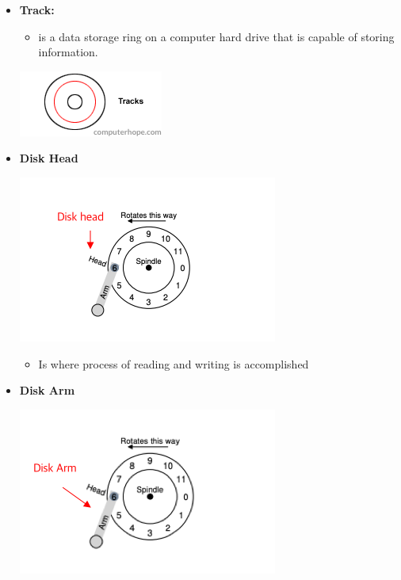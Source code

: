 \documentclass[12pt]{article}
\begin{document}
\begin{itemize}
    \item \textbf{Track:}
    \begin{itemize}
        \item is a data storage ring on a computer hard drive
    that is capable of storing information.
    \end{itemize}

    \begin{center}
        \includegraphics[width=0.4\linewidth]{../images/midterm_4_solution_50.png}
    \end{center}

    \item \textbf{Disk Head}
    \begin{center}
        \includegraphics[width=0.6\linewidth]{../images/midterm_4_solution_51.png}
    \end{center}

    \begin{itemize}
        \item Is where process of reading and writing is accomplished
    \end{itemize}

    \item \textbf{Disk Arm}

    \begin{center}
        \includegraphics[width=0.6\linewidth]{../images/midterm_4_solution_52.png}
    \end{center}


\end{itemize}
\end{document}

